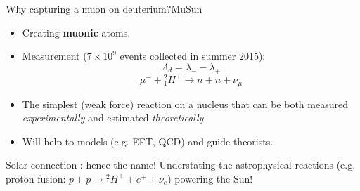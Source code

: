 \documentclass{beamer}
\begin{document}
\begin{frame}{Why capturing a muon on deuterium?}{MuSun}
  \begin{itemize}
  \item {Creating \textbf{muonic} atoms.}
  \item {Measurement ($7 \times 10^9$ events collected in summer 2015): 
  \begin{equation}
  \Lambda _d=\lambda_- - \lambda_+    
  \end{equation}
  \begin{equation}
  \mu^- + {_{1}^{2}H^+} \rightarrow n + n + \nu_{\mu} 
  \end{equation} }
  \item The simplest (weak force) reaction on a nucleus that can be both measured \textit{experimentally} and estimated \textit{theoretically}
  \item Will help to  models (e.g. EFT, QCD) and guide theorists.
  \end{itemize}
 
 \begin{block}{Solar connection}
  : hence the name! 
  Understating the astrophysical reactions (e.g. proton fusion: $p + p \rightarrow  {_{1}^{2}H^+} + e^+ + \nu_{e} $) powering the Sun!
\end{block}
 
\end{frame}
\end{document}

